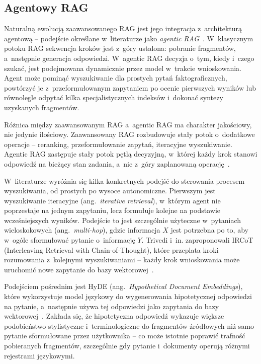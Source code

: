 \clearpage{}

\subsection{Agentowy RAG}\label{subsec:agentowy-rag}

Naturalną ewolucją zaawansowanego RAG jest jego integracja z~architekturą
agentową -- podejście określane w~literaturze jako \textit{agentic
  RAG}~\cite{wang2024survey}. W~klasycznym potoku RAG sekwencja kroków jest
z~góry ustalona: pobranie fragmentów, a~następnie generacja odpowiedzi.
W~agentic RAG decyzja o~tym, kiedy i~czego szukać, jest podejmowana dynamicznie
przez model w~trakcie wnioskowania. Agent może pominąć wyszukiwanie dla
prostych pytań faktograficznych, powtórzyć je z~przeformułowanym zapytaniem po
ocenie pierwszych wyników lub równolegle odpytać kilka specjalistycznych
indeksów i~dokonać syntezy uzyskanych fragmentów.

Różnica między zaawansowanym RAG a~agentic RAG ma charakter jakościowy, nie
jedynie ilościowy. Zaawansowany RAG rozbudowuje stały potok o~dodatkowe
operacje -- reranking, przeformułowanie zapytań, iteracyjne wyszukiwanie.
Agentic RAG zastępuje stały potok pętlą decyzyjną, w~której każdy krok stanowi
odpowiedź na bieżący stan zadania, a~nie z~góry zaplanowaną
operację~\cite{xi2025rise}.

W~literaturze wyróżnia się kilka konkretnych podejść do sterowania procesem
wyszukiwania, od prostych po wysoce autonomiczne. Pierwszym jest wyszukiwanie
iteracyjne (ang.~\textit{iterative retrieval}), w~którym agent nie poprzestaje
na jednym zapytaniu, lecz formułuje kolejne na podstawie wcześniejszych
wyników. Podejście to jest szczególnie użyteczne w~pytaniach wieloskokowych
(ang.~\textit{multi-hop}), gdzie informacja $X$ jest potrzebna po to, aby
w~ogóle sformułować pytanie o~informację $Y$. Trivedi i~in. zaproponowali
IRCoT (Interleaving Retrieval with Chain-of-Thought), które przeplata kroki 
rozumowania z~kolejnymi wyszukiwaniami -- każdy krok wnioskowania może 
uruchomić nowe zapytanie do bazy wektorowej~\cite{trivedi2023interleaving}.

Podejściem pośrednim jest HyDE (ang.~\textit{Hypothetical Document
  Embeddings}), które wykorzystuje model językowy do wygenerowania hipotetycznej
odpowiedzi na pytanie, a~następnie używa tej odpowiedzi jako zapytania do bazy
wektorowej~\cite{gao2023precise}. Zakłada się, że hipotetyczna odpowiedź
wykazuje większe podobieństwo stylistyczne i~terminologiczne do fragmentów
źródłowych niż samo pytanie sformułowane przez użytkownika -- co może istotnie
poprawić trafność pobieranych fragmentów, szczególnie gdy pytanie i~dokumenty
operują różnymi rejestrami językowymi.

